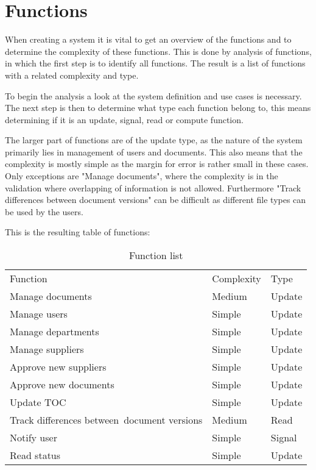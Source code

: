 \section{Functions}
When creating a system it is vital to get an overview of the functions and to determine the complexity of these functions. This is done by analysis of functions, in which the first step is to identify all functions. The result is a list of functions with a related complexity and type.

To begin the analysis a look at the system definition and use cases is necessary. The next step is then to determine what type each function belong to, this means determining if it is an update, signal, read or compute function.

The larger part of functions are of the update type, as the nature of the system primarily lies in management of users and documents. This also means that the complexity is mostly simple as the margin for error is rather small in these cases. Only exceptions are "Manage documents", where the complexity is in the validation where overlapping of information is not allowed. Furthermore "Track differences between document versions" can be difficult as different file types can be used by the users. 

This is the resulting table of functions:

\begin{table}[H]
\centering
\begin{tabular}{lll}
Function                                    & Complexity & Type    \\
Manage documents                            & Medium     & Update  \\
Manage users                                & Simple     & Update  \\
Manage departments                          & Simple     & Update  \\
Manage suppliers                            & Simple     & Update  \\
Approve new suppliers                       & Simple     & Update  \\
Approve new documents                       & Simple     & Update  \\
Update TOC                                  & Simple     & Update  \\
Track differences between~document versions & Medium     & Read    \\
Notify user                                 & Simple     & Signal  \\
Read status                                 & Simple     & Update 
\end{tabular}
\caption{Function list}
\end{table}

